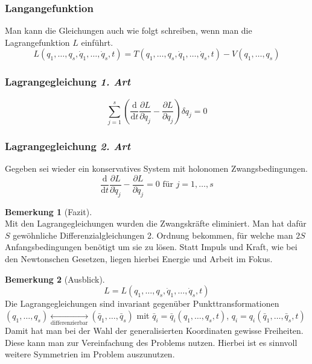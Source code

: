 \documentclass[oneside]{book}
\theoremstyle{definition}
\newtheorem*{bemerkung*}{Bemerkung}
\renewcommand{\d}{\mathrm d}
\newcommand{\dd}[1]{\frac{\d}{\d #1}}
\newcommand{\ffpartial}[2]{\frac{\partial #1}{\partial #2}}
\newcommand{\vardots}[2]{#1_1, \dots, #1_#2}
\begin{document}
\subsubsection{Langangefunktion}
Man kann die Gleichungen auch wie folgt schreiben, wenn man die Lagrangefunktion $L$ einführt.
$$L(q_1, \dots, q_s, \dot{q}_1, \dots, \dot{q}_s, t) = T(q_1, \dots, q_s, \dot{q}_1, \dots, \dot{q}_s, t) - V(q_1, \dots, q_s)$$

\subsubsection{Lagrangegleichung \textit{1. Art}}
$$\sum_{j = 1}^s  (  \dd{t} \ffpartial{L}{\dot{q}_j} - \ffpartial{L}{q_j}  ) \delta q_j = 0$$

\subsubsection{Lagrangegleichung \textit{2. Art}}
Gegeben sei wieder ein konservatives System mit holonomen Zwangsbedingungen.
$$ \dd{t} \ffpartial{L}{\dot{q}_j} - \ffpartial{L}{q_j} = 0 \text{~für~} j= 1, \dots, s$$

\begin{bemerkung*}[Fazit]~\\
	Mit den Lagrangegleichungen wurden die Zwangskräfte eliminiert. Man hat dafür $S$ gewöhnliche Differenzialgleichungen 2. Ordnung bekommen, für welche man $2S$ Anfangsbedingungen benötigt um sie zu lösen.
	Statt Impuls und Kraft, wie bei den Newtonschen Gesetzen, liegen hierbei Energie und Arbeit im Fokus.
\end{bemerkung*}

\begin{bemerkung*}[Ausblick]
	$$L = L(\vardots{q}{s}, \vardots{\dot{q}}{s}, t)$$
	Die Lagrangegleichungen sind invariant gegenüber Punkttransformationen \\
	$(\vardots{q}{s}) \underset{\text{differenzierbar}}{\leftrightarrow} (\vardots{\bar{q}}{s})$ mit $\bar{q}_i = \bar{q}_i(\vardots{q}{s}, t)$, $q_i = q_i(\vardots{\bar{q}}{s}, t)$
	Damit hat man bei der Wahl der generalisierten Koordinaten gewisse Freiheiten. Diese kann man zur Vereinfachung des Problems nutzen. Hierbei ist es sinnvoll weitere Symmetrien im Problem auszunutzen.
\end{bemerkung*}
\end{document}
